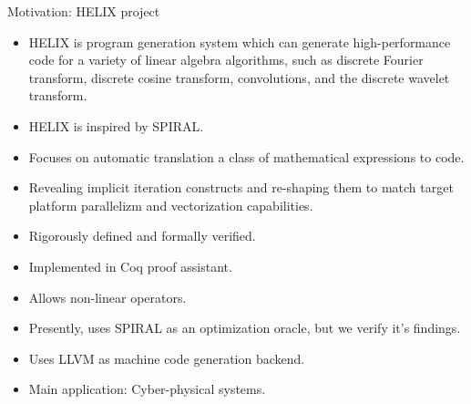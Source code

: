 \documentclass[aspectratio=169]{beamer}
\begin{document}
\begin{frame}{Motivation: HELIX project}
  \begin{itemize}
  \item HELIX is program generation system which can
    generate high-performance code for a variety of linear algebra
    algorithms, such as discrete Fourier transform, discrete cosine
    transform, convolutions, and the discrete wavelet transform.
  \item HELIX is inspired by SPIRAL.
  \item Focuses on automatic translation a class of mathematical
    expressions to code.
  \item Revealing implicit iteration constructs and re-shaping them to
    match target platform parallelizm and vectorization capabilities. 
  \item Rigorously defined and formally verified.
  \item Implemented in Coq proof assistant.
  \item Allows non-linear operators.
  \item Presently, uses SPIRAL as an optimization oracle, but we verify
    it's findings.
  \item Uses LLVM as machine code generation backend.
  \item Main application: Cyber-physical systems.
  \end{itemize}

\end{frame}
\end{document}
